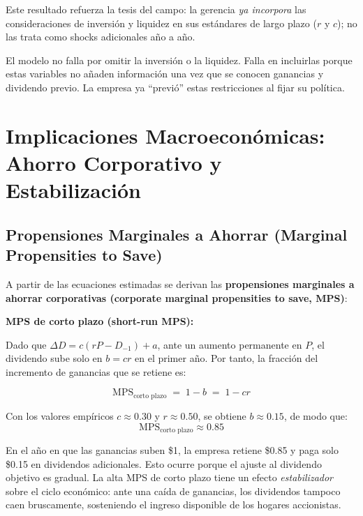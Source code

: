 \documentclass[12pt]{article}
\begin{document}
Este resultado refuerza la tesis del campo: la gerencia \textit{ya incorpora} las
consideraciones de inversi\'on y liquidez en sus est\'andares de largo plazo ($r$ y $c$);
no las trata como shocks adicionales a\~no a a\~no.

\begin{intuicion}
El modelo no falla por omitir la inversi\'on o la liquidez. Falla en incluirlas porque
estas variables no a\~naden informaci\'on una vez que se conocen ganancias y dividendo previo.
La empresa ya ``previ\'o'' estas restricciones al fijar su pol\'itica.
\end{intuicion}

\section{Implicaciones Macroecon\'omicas: Ahorro Corporativo y Estabilizaci\'on}

\subsection{Propensiones Marginales a Ahorrar (Marginal Propensities to Save)}

A partir de las ecuaciones estimadas se derivan las \textbf{propensiones marginales a ahorrar
corporativas (corporate marginal propensities to save, MPS)}:

\medskip
\noindent \textbf{MPS de corto plazo (short-run MPS):}

Dado que $\Delta D = c(rP - D_{-1}) + a$, ante un aumento permanente en $P$, el dividendo
sube solo en $b = cr$ en el primer a\~no. Por tanto, la fracci\'on del incremento de ganancias
que se retiene es:

\begin{equation}
  \text{MPS}_{\text{corto plazo}} \;=\; 1 - b \;=\; 1 - cr
\end{equation}

Con los valores emp\'iricos $c \approx 0.30$ y $r \approx 0.50$, se obtiene $b \approx 0.15$,
de modo que:
\[
  \text{MPS}_{\text{corto plazo}} \approx 0.85
\]

\begin{intuicionmat}
En el a\~no en que las ganancias suben \$1, la empresa retiene \$0.85 y paga solo \$0.15
en dividendos adicionales. Esto ocurre porque el ajuste al dividendo objetivo es gradual.
La alta MPS de corto plazo tiene un efecto \textit{estabilizador} sobre el ciclo econ\'omico:
ante una ca\'ida de ganancias, los dividendos tampoco caen bruscamente, sosteniendo el ingreso
disponible de los hogares accionistas.
\end{intuicionmat}
\end{document}
